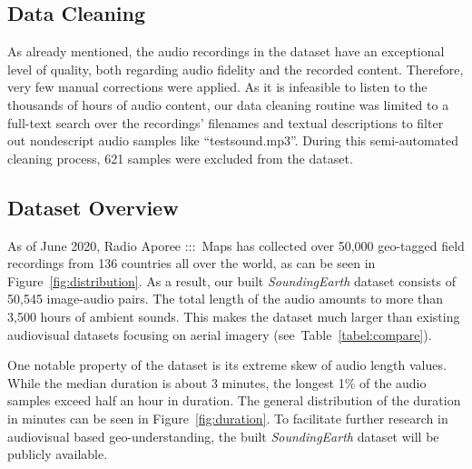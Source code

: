 \documentclass[journal]{IEEEtran}
\begin{document}
\subsection{Data Cleaning}
As already mentioned, the audio recordings in the dataset have an exceptional level of quality, both regarding audio fidelity and the recorded content. Therefore, very few manual corrections were applied. As it is infeasible to listen to the thousands of hours of audio content, our data cleaning routine was limited to a full-text search over the recordings' filenames and textual descriptions to filter out nondescript audio samples like ``testsound.mp3''. During this semi-automated cleaning process, 621 samples were excluded from the dataset.

\subsection{Dataset Overview}\label{subsec:data_overview}
As of June 2020, Radio Aporee :::~Maps has collected over 50,000 geo-tagged
field recordings from 136 countries all over the world,
as can be seen in Figure~\ref{fig:distribution}.
As a result, our built \emph{SoundingEarth} dataset consists of 50,545 image-audio pairs.
The total length of the audio amounts to more than 3,500 hours of ambient sounds.
This makes the dataset much larger than existing audiovisual datasets focusing
on aerial imagery (see~Table~\ref{tabel:compare}).

One notable property of the dataset is its extreme skew of audio length values.
While the median duration is about 3 minutes, the longest 1\% of the audio samples exceed half an hour in duration. The general distribution of the duration in minutes can be seen in Figure~\ref{fig:duration}.
To facilitate further research in audiovisual based geo-understanding,
the built \emph{SoundingEarth} dataset will be publicly available.
\end{document}
